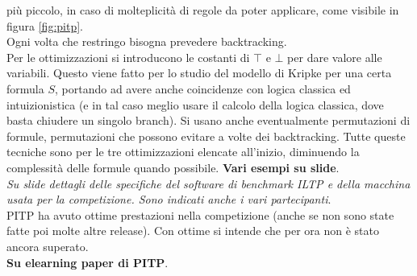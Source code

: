 \documentclass[a4paper,12pt, oneside]{book}
\begin{document}
più piccolo, in caso di molteplicità di regole da poter applicare, come visibile
in figura \ref{fig:pitp}.\\
Ogni volta che restringo bisogna prevedere backtracking.\\
Per le ottimizzazioni si introducono le costanti di $\top$ e $\bot$ per dare
valore alle variabili. Questo viene fatto per lo studio del modello di Kripke
per una certa formula $S$, portando ad avere anche coincidenze con logica
classica ed intuizionistica (e in tal caso meglio usare il calcolo della logica
classica, dove basta chiudere un singolo branch). Si usano anche eventualmente
permutazioni di formule, permutazioni che possono evitare a volte dei
backtracking. Tutte queste tecniche sono per le tre ottimizzazioni elencate
all'inizio, diminuendo la complessità delle formule quando
possibile. \textbf{Vari esempi su slide}.\\
\textit{Su slide dettagli delle specifiche del software di benchmark ILTP e
  della macchina usata per la competizione. Sono indicati anche i vari
  partecipanti}. \\
PITP ha avuto ottime prestazioni nella competizione (anche se non sono state
fatte poi molte altre release). Con ottime si intende che per ora non è stato
ancora superato.\\
\textbf{Su elearning paper di PITP}.
\end{document}
